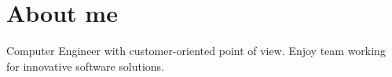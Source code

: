 \documentclass[11pt,a4paper,sans]{moderncv}   %
\begin{document}
\maketitle

\section{About me}
\cvitem
    {}
    {Computer Engineer with customer-oriented point of view. Enjoy team working for innovative software solutions.}{}





\nocite{*}
%
\end{document}
